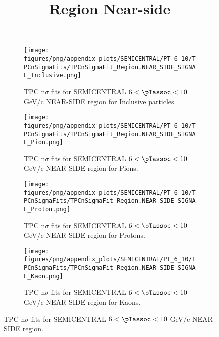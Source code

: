             \begin{figure}[H]
                \title{Region Near-side}
                \begin{subfigure}[b]{0.5\textwidth}
                    \centering
                    \texttt{[image: figures/png/appendix\_plots/SEMICENTRAL/PT\_6\_10/TPCnSigmaFits/TPCnSigmaFit\_Region.NEAR\_SIDE\_SIGNAL\_Inclusive.png]}
                    \caption{TPC n$\sigma$ fits for SEMICENTRAL $6 < \pTassoc < 10$ GeV/c NEAR-SIDE region for Inclusive particles.}
                    \label{fig:appendix_SEMICENTRAL_$6 < \pTassoc < 10$ GeV/c_NEAR_SIDE_SIGNAL_Inclusive}
                \end{subfigure}
                \begin{subfigure}[b]{0.5\textwidth}
                    \centering
                    \texttt{[image: figures/png/appendix\_plots/SEMICENTRAL/PT\_6\_10/TPCnSigmaFits/TPCnSigmaFit\_Region.NEAR\_SIDE\_SIGNAL\_Pion.png]}
                    \caption{TPC n$\sigma$ fits for SEMICENTRAL $6 < \pTassoc < 10$ GeV/c NEAR-SIDE region for Pions.}
                    \label{fig:appendix_SEMICENTRAL_$6 < \pTassoc < 10$ GeV/c_NEAR_SIDE_SIGNAL_Pion}
                \end{subfigure}
                \begin{subfigure}[b]{0.5\textwidth}
                    \centering
                    \texttt{[image: figures/png/appendix\_plots/SEMICENTRAL/PT\_6\_10/TPCnSigmaFits/TPCnSigmaFit\_Region.NEAR\_SIDE\_SIGNAL\_Proton.png]}
                    \caption{TPC n$\sigma$ fits for SEMICENTRAL $6 < \pTassoc < 10$ GeV/c NEAR-SIDE region for Protons.}
                    \label{fig:appendix_SEMICENTRAL_$6 < \pTassoc < 10$ GeV/c_NEAR_SIDE_SIGNAL_Proton}
                \end{subfigure}
                \begin{subfigure}[b]{0.5\textwidth}
                    \centering
                    \texttt{[image: figures/png/appendix\_plots/SEMICENTRAL/PT\_6\_10/TPCnSigmaFits/TPCnSigmaFit\_Region.NEAR\_SIDE\_SIGNAL\_Kaon.png]}
                    \caption{TPC n$\sigma$ fits for SEMICENTRAL $6 < \pTassoc < 10$ GeV/c NEAR-SIDE region for Kaons.}
                    \label{fig:appendix_SEMICENTRAL_$6 < \pTassoc < 10$ GeV/c_NEAR_SIDE_SIGNAL_Kaon}
                \end{subfigure}
                \caption{TPC n$\sigma$ fits for SEMICENTRAL $6 < \pTassoc < 10$ GeV/c NEAR-SIDE region.}
                \label{fig:appendix_SEMICENTRAL_$6 < \pTassoc < 10$ GeV/c_NEAR_SIDE_SIGNAL}
            \end{figure}

